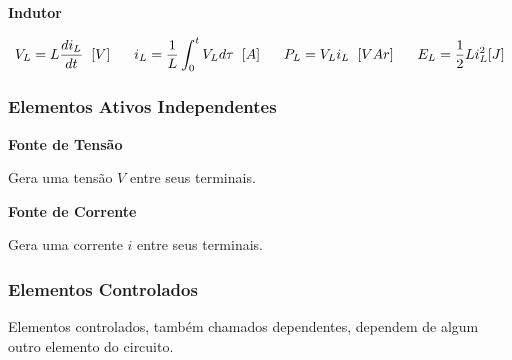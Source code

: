 \documentclass{article}
\numberwithin{equation}{section}
\newlength\Colsep
\begin{document}
    \begin{center}{\textbf{Indutor}}\end{center}
    \begin{equation}
        V_{L} = L \frac{di_{L}}{dt} \hspace{0.2cm}[V]
        \hspace{0.6cm}
        i_{L} = \frac{1}{L}\int_{0}^{t}{V_{L}} d\tau \hspace{0.2cm} [A]
        \hspace{0.6cm}
        P_{L} = V_{L}i_{L} \hspace{0.2cm} [VAr]
        \hspace{0.6cm}
        E_{L} = \frac{1}{2}Li_{L}^{2} [J]
    \end{equation}

    \subsubsection{Elementos Ativos Independentes}
    \label{subsubsec:ativos}

    \begin{minipage}[c][5cm]{\dimexpr0.5\textwidth-0.5\Colsep\relax}
        \begin{center}{\textbf{Fonte de Tensão}}\end{center}

        Gera uma tensão $V$ entre seus terminais.
    \end{minipage} \hfill
    \begin{minipage}[c][5cm]{\dimexpr0.5\textwidth-0.5\Colsep\relax}
        \begin{center}{\textbf{Fonte de Corrente}}\end{center}

        Gera uma corrente $i$ entre seus terminais.
    \end{minipage} \hfill
    \justifying
    \subsubsection{Elementos Controlados}
    \label{subsubsec:controlados}
    Elementos controlados, também chamados dependentes, dependem de algum outro elemento do circuito.
\end{document}
